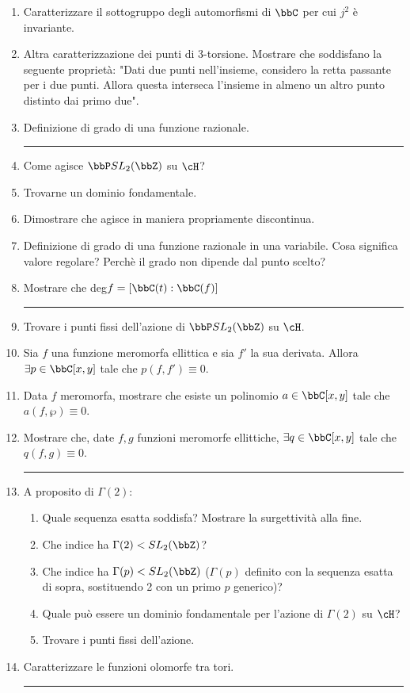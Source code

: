 \begin{enumerate}
\item Caratterizzare il sottogruppo degli automorfismi di $\bbC$ per cui $j^2$ è invariante.
\item Altra caratterizzazione dei punti di 3-torsione. Mostrare che soddisfano la seguente proprietà: "Dati due punti nell'insieme, considero la retta passante per i due punti. Allora questa interseca l'insieme in almeno un altro punto distinto dai primo due". 
\item Definizione di grado di una funzione razionale.
\bigskip
\hrule
\bigskip

\item Come agisce $\bbP SL_2(\bbZ)$ su $\cH$?
\item Trovarne un dominio fondamentale.
\item Dimostrare che agisce in maniera propriamente discontinua.
\item Definizione di grado di una funzione razionale in una variabile. Cosa significa valore regolare? Perchè il grado non dipende dal punto scelto?
\item Mostrare che deg$f=[\bbC(t):\bbC(f)]$
\bigskip
\hrule
\bigskip

\item Trovare i punti fissi dell'azione di $\bbP SL_{2}(\bbZ)$ su $\cH$.
\item Sia $f$ una funzione meromorfa ellittica e sia $f'$ la sua derivata. Allora $\exists p\in \bbC[x, y]$ tale che $p(f, f')\equiv 0$.
\item Data $f$ meromorfa, mostrare che esiste un polinomio $a\in\bbC[x, y]$ tale che $a(f, \wp)\equiv 0$.
\item Mostrare che, date $f, g$ funzioni meromorfe ellittiche, $\exists q\in \bbC[x, y]$ tale che $q(f, g)\equiv 0$.
\bigskip
\hrule
\bigskip

\item A proposito di $\Gamma(2)$:
\begin{enumerate}[label=(\alph*)]
	\item Quale sequenza esatta soddisfa? Mostrare la surgettività alla fine.
	\item Che indice ha $\Gamma(2) < SL_{2}(\bbZ)$?
	\item Che indice ha $\Gamma(p) < SL_{2}(\bbZ)$ ($\Gamma(p)$ definito con la sequenza esatta di sopra, sostituendo 2 con un primo $p$ generico)?
	\item Quale può essere un dominio fondamentale per l'azione di $\Gamma(2)$ su $\cH$?
	\item Trovare i punti fissi dell'azione.
\end{enumerate}
\item Caratterizzare le funzioni olomorfe tra tori.
\bigskip
\hrule
\bigskip


\end{enumerate}
